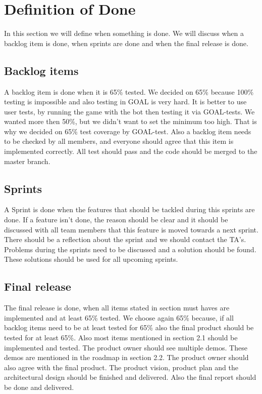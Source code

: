 \newpage
\section{Definition of Done}
In this section we will define when something is done. We will discuss when a backlog item is done, when sprints are done and when the final release is done.
\subsection{Backlog items}
A backlog item is done when it is 65\% tested. We decided on 65\% because 100\% testing is impossible and also testing in GOAL is very hard. It is better to use user tests, by running the game with the bot then testing it via GOAL-tests. We wanted more then 50\%, but we didn't want to set the minimum too high. That is why we decided on 65\% test coverage by GOAL-test.  Also a backlog item needs to be checked by all members, and everyone should agree that this item is implemented correctly. All test should pass and the code should be merged to the master branch.
\subsection{Sprints}
A Sprint is done when the features that should be tackled during this sprints are done. If a feature isn't done, the reason should be clear and it should be discussed with all team members that this feature is moved towards a next sprint. There should be a reflection about the sprint and we should contact the TA's. Problems during the sprints need to be discussed and a solution should be found. These solutions should be used for all upcoming sprints.
\subsection{Final release}
The final release is done, when all items stated in section must haves are implemented and at least 65\% tested. We choose again 65\% because, if all backlog items need to be at least tested for 65\% also the final product should be tested for at least 65\%. Also most items mentioned in section 2.1 should be implemented and tested. \newline
The product owner should see multiple demos. These demos are mentioned in the roadmap in section 2.2. The product owner should also agree with the final product. \newline
The product vision, product plan and the architectural design should be finished and delivered. Also the final report should be done and delivered. 

\newpage